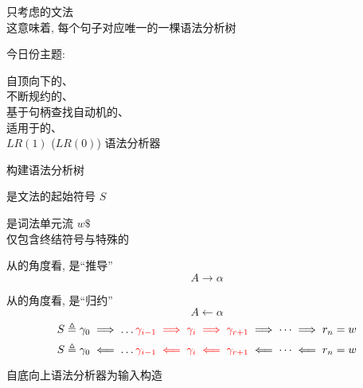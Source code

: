 
\begin{frame}{}
  \begin{center}
    只考虑的文法 \\[4pt]
    这意味着, 每个句子对应唯一的一棵语法分析树


    今日份主题: 
  \end{center}
\end{frame}

\begin{frame}{}
  \begin{center}
    自顶向下的、\\[15pt]
    不断规约的、\\[15pt]
    基于句柄查找自动机的、\\[15pt]
    适用于的、\\[15pt]
    $LR(1)$ ($LR(0)$) 语法分析器
  \end{center}
\end{frame}

\begin{frame}{}
  \begin{center}
    {\large {}构建语法分析树}

    \vspace{0.60cm}
    是文法的起始符号 $S$

    \vspace{1.00cm}

    \vspace{1.00cm}
    是词法单元流 $w\$$ \\[8pt]
    仅包含终结符号与特殊的
  \end{center}
\end{frame}

\begin{frame}{}
  \begin{center}

    \vspace{0.60cm}
    从的角度看, 是``推导''
    \[
      A \to \alpha
    \]

    从的角度看, 是``归约''
    \[
      A \gets \alpha
    \]
    \[
      S \triangleq \gamma_{0} \implies \dots
        \textcolor{red}{\gamma_{i-1} \implies \gamma_{i} \implies \gamma_{r+1}}
        \implies \dots \implies r_{n} = w
    \]
    \[
      S \triangleq \gamma_{0} \impliedby \dots
        \textcolor{red}{\gamma_{i-1} \impliedby \gamma_{i} \impliedby \gamma_{r+1}}
        \impliedby \dots \impliedby r_{n} = w
    \]

    自底向上语法分析器为输入构造
  \end{center}
\end{frame}

